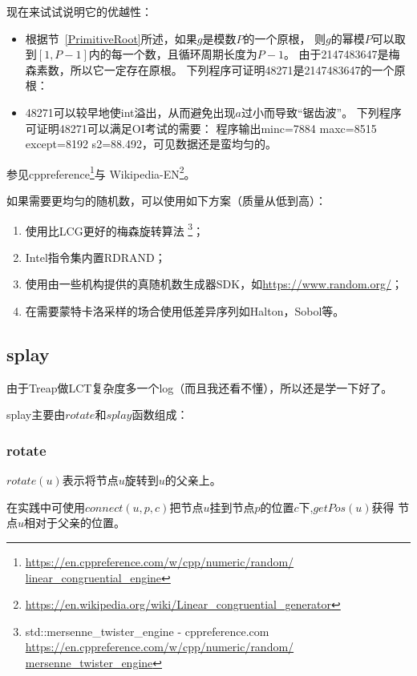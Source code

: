 现在来试试说明它的优越性：

\begin{itemize}
    \item 根据节~\ref{PrimitiveRoot}所述，如果$g$是模数$P$的一个原根，
    则$g$的幂模$P$可以取到$[1,P-1]$内的每一个数，且循环周期长度为$P-1$。
    由于2147483647是梅森素数，所以它一定存在原根。
    下列程序可证明48271是2147483647的一个原根：
    
    \item 48271可以较早地使int溢出，从而避免出现$a$过小而导致``锯齿波''。
    下列程序可证明48271可以满足OI考试的需要：
    程序输出minc=7884 maxc=8515 except=8192 s2=88.492，可见数据还是蛮均匀的。
\end{itemize}

参见cppreference\footnote{
    \url{https://en.cppreference.com/w/cpp/numeric/random/
    linear\_congruential\_engine}}与
    Wikipedia-EN\footnote{
    \url{https://en.wikipedia.org/wiki/Linear\_congruential\_generator}}。

如果需要更均匀的随机数，可以使用如下方案（质量从低到高）：
\begin{enumerate}
    \item 使用比LCG更好的梅森旋转算法
    \footnote{std::mersenne\_twister\_engine - cppreference.com
    \url{https://en.cppreference.com/w/cpp/numeric/random/
    mersenne\_twister\_engine}}；
    \item Intel指令集内置RDRAND；
    \item 使用由一些机构提供的真随机数生成器SDK，如\url{https://www.random.org/}；
    \item 在需要蒙特卡洛采样的场合使用低差异序列如Halton，Sobol等。
\end{enumerate}

\subsection{splay}\label{splay}

由于Treap做LCT复杂度多一个log（而且我还看不懂），所以还是学一下好了。

splay主要由$rotate$和$splay$函数组成：

\subsubsection{rotate}

$rotate(u)$表示将节点$u$旋转到$u$的父亲上。

在实践中可使用$connect(u,p,c)$把节点$u$挂到节点$p$的位置$c$下,$getPos(u)$获得
节点$u$相对于父亲的位置。

